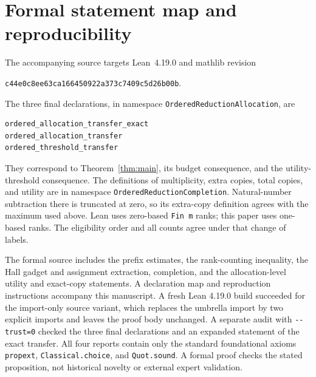 \documentclass[11pt,a4paper]{article}
\begin{document}
\section{Formal statement map and reproducibility}
The accompanying source targets Lean~4.19.0 and mathlib revision
\begin{center}
\texttt{\small c44e0c8ee63ca166450922a373c7409c5d26b00b}.
\end{center}
The three final declarations, in namespace
\texttt{OrderedReductionAllocation}, are
\begin{verbatim}
ordered_allocation_transfer_exact
ordered_allocation_transfer
ordered_threshold_transfer
\end{verbatim}
They correspond to Theorem~\ref{thm:main}, its budget consequence, and the
utility-threshold consequence. The definitions of multiplicity, extra
copies, total copies, and utility are in namespace
\texttt{OrderedReductionCompletion}. Natural-number subtraction there is
truncated at zero, so its extra-copy definition agrees with the maximum
used above. Lean uses zero-based \texttt{Fin m} ranks; this paper uses
one-based ranks. The eligibility order and all counts agree under that
change of labels.

The formal source includes the prefix estimates, the rank-counting
inequality, the Hall gadget and assignment extraction, completion, and the
allocation-level utility and exact-copy statements. A declaration map and reproduction instructions accompany this manuscript.
A fresh Lean 4.19.0 build succeeded for the import-only source variant,
which replaces the umbrella import by two explicit imports and leaves the
proof body unchanged. A separate audit with \texttt{-{}-trust=0} checked the
three final declarations and an expanded statement of the exact transfer.
All four reports contain only the standard foundational axioms
\texttt{propext}, \texttt{Classical.choice}, and \texttt{Quot.sound}.
A formal proof checks the stated proposition, not historical novelty or
external expert validation.



\end{document}
